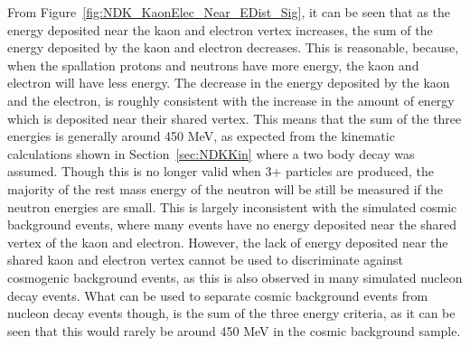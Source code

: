 From Figure~\ref{fig:NDK_KaonElec_Near_EDist_Sig}, it can be seen that as the energy deposited near the kaon and electron vertex increases, the sum of the energy deposited by the kaon and electron decreases. This is reasonable, because, when the spallation protons and neutrons have more energy, the kaon and electron will have less energy. The decrease in the energy deposited by the kaon and the electron, is roughly consistent with the increase in the amount of energy which is deposited near their shared vertex. This means that the sum of the three energies is generally around 450 MeV, as expected from the kinematic calculations shown in Section~\ref{sec:NDKKin} where a two body decay was assumed. Though this is no longer valid when 3+ particles are produced, the majority of the rest mass energy of the neutron will be still be measured if the neutron energies are small. This is largely inconsistent with the simulated cosmic background events, where many events have no energy deposited near the shared vertex of the kaon and electron. However, the lack of energy deposited near the shared kaon and electron vertex cannot be used to discriminate against cosmogenic background events, as this is also observed in many simulated nucleon decay events. What can be used to separate cosmic background events from nucleon decay events though, is the sum of the three energy criteria, as it can be seen that this would rarely be around 450 MeV in the cosmic background sample. \\

